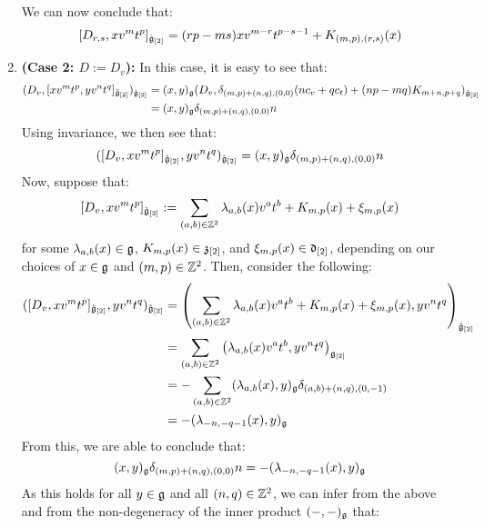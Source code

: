 \begin{remark}
\begin{enumerate}
                We can now conclude that:
                    $$[D_{r, s}, x v^m t^p]_{\hat{\mathfrak{g}}_{[2]}} = ( rp - ms ) x v^{m - r} t^{p - s - 1} + K_{(m, p), (r, s)}(x)$$
                \item \textbf{(Case 2: $D := D_v$):} In this case, it is easy to see that:
                    $$
                        \begin{aligned}
                            ( D_v, [x v^m t^p, y v^n t^q]_{\tilde{\mathfrak{g}}_{[2]}} )_{\hat{\mathfrak{g}}_{[2]}} & = (x, y)_{\mathfrak{g}} ( D_v, \delta_{(m, p) + (n, q), (0, 0)} ( n c_v + q c_t ) + (np - mq) K_{m + n, p + q} )_{\hat{\mathfrak{g}}_{[2]}}
                            \\
                            & = (x, y)_{\mathfrak{g}} \delta_{(m, p) + (n, q), (0, 0)} n
                        \end{aligned}
                    $$
                Using invariance, we then see that:
                    $$( [D_v, x v^m t^p]_{\hat{\mathfrak{g}}_{[2]}}, y v^n t^q )_{\hat{\mathfrak{g}}_{[2]}} = (x, y)_{\mathfrak{g}} \delta_{(m, p) + (n, q), (0, 0)} n$$
                Now, suppose that:
                    $$[D_v, x v^m t^p]_{\hat{\mathfrak{g}}_{[2]}} := \sum_{(a, b) \in \mathbb{Z}^2} \lambda_{a, b}(x) v^a t^b + K_{m, p}(x) + \xi_{m, p}(x)$$
                for some $\lambda_{a, b}(x) \in \mathfrak{g}$, $K_{m, p}(x) \in \mathfrak{z}_{[2]}$, and $\xi_{m, p}(x) \in \mathfrak{d}_{[2]}$, depending on our choices of $x \in \mathfrak{g}$ and $(m, p) \in \mathbb{Z}^2$. Then, consider the following:
                    $$
                        \begin{aligned}
                            ( [D_v, x v^m t^p]_{\hat{\mathfrak{g}}_{[2]}}, y v^n t^q )_{\hat{\mathfrak{g}}_{[2]}} & = \left( \sum_{(a, b) \in \mathbb{Z}^2} \lambda_{a, b}(x) v^a t^b + K_{m, p}(x) + \xi_{m, p}(x), y v^n t^q \right)_{\hat{\mathfrak{g}}_{[2]}}
                            \\
                            & = \sum_{(a, b) \in \mathbb{Z}^2} \left( \lambda_{a, b}(x) v^a t^b, y v^n t^q \right)_{\mathfrak{g}_{[2]}}
                            \\
                            & = -\sum_{(a, b) \in \mathbb{Z}^2} (\lambda_{a, b}(x), y)_{\mathfrak{g}} \delta_{ (a, b) + (n, q), (0, -1) }
                            \\
                            & = -(\lambda_{-n, -q - 1}(x), y)_{\mathfrak{g}}
                        \end{aligned}
                    $$
                From this, we are able to conclude that:
                    $$(x, y)_{\mathfrak{g}} \delta_{(m, p) + (n, q), (0, 0)} n = -(\lambda_{-n, -q - 1}(x), y)_{\mathfrak{g}}$$
                As this holds for all $y \in \mathfrak{g}$ and all $(n, q) \in \mathbb{Z}^2$, we can infer from the above and from the non-degeneracy of the inner product $(-, -)_{\mathfrak{g}}$ that:

\end{enumerate}
\end{remark}
